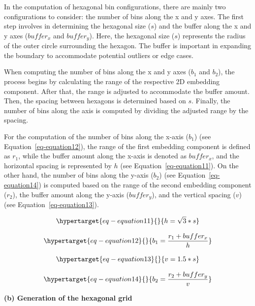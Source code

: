 \documentclass[
  12pt]{article}
\begin{document}
In the computation of hexagonal bin configurations, there are mainly two
configurations to consider: the number of bins along the x and y axes.
The first step involves in determining the hexagonal size (\(s\)) and
the buffer along the x and y axes (\(buffer_{x}\) and \(buffer_{y}\)).
Here, the hexagonal size (\(s\)) represents the radius of the outer
circle surrounding the hexagon. The buffer is important in expanding the
boundary to accommodate potential outliers or edge cases.

When computing the number of bins along the x and y axes (\(b_1\) and
\(b_2\)), the process begins by calculating the range of the respective
2D embedding component. After that, the range is adjusted to accommodate
the buffer amount. Then, the spacing between hexagons is determined
based on \(s\). Finally, the number of bins along the axis is computed
by dividing the adjusted range by the spacing.

For the computation of the number of bins along the x-axis (\(b_1\))
(see Equation~\ref{eq-equation12}), the range of the first embedding
component is defined as \(r_1\), while the buffer amount along the
x-axis is denoted as \(buffer_{x}\), and the horizontal spacing is
represented by \(h\) (see Equation~\ref{eq-equation11}). On the other
hand, the number of bins along the y-axis (\(b_2\)) (see
Equation~\ref{eq-equation14}) is computed based on the range of the
second embedding component (\(r_2\)), the buffer amount along the y-axis
(\(buffer_{y}\)), and the vertical spacing (\(v\)) (see
Equation~\ref{eq-equation13}).

\begin{equation}\protect\hypertarget{eq-equation11}{}{
 h = \sqrt{3} * s
}\label{eq-equation11}\end{equation}

\begin{equation}\protect\hypertarget{eq-equation12}{}{
 b_1 = \frac{r_1 + buffer_{x}}{h}
}\label{eq-equation12}\end{equation}

\begin{equation}\protect\hypertarget{eq-equation13}{}{
  v = 1.5 * s
}\label{eq-equation13}\end{equation}

\begin{equation}\protect\hypertarget{eq-equation14}{}{
 b_2 = \frac{r_2 + buffer_{y}}{v}
}\label{eq-equation14}\end{equation}

\textbf{(b) Generation of the hexagonal grid}
\end{document}
